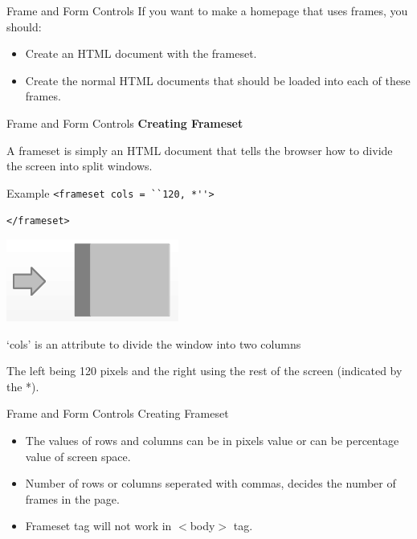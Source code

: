 \documentclass[14pt]{beamer}
\begin{document}
\begin{frame}{Frame and Form Controls}
If you want to make a homepage that uses frames, you should: 
\begin{itemize}
 \item Create an HTML document with the frameset.
 \item Create the normal HTML documents that should be loaded into each of these frames.
\end{itemize}
\end{frame}

\begin{frame}{Frame and Form Controls}
\textbf{Creating Frameset}

\vspace{1pc}
\small
A frameset is simply an HTML document that tells the browser how to divide the screen into split windows.

\begin{minipage}{5cm}
\begin{block}{Example}
\lstinline!<frameset cols = ``120, *''>!

\lstinline!</frameset>!
\end{block}
\end{minipage}
\quad
\begin{minipage}{4cm}
\includegraphics[scale=.4]{frameset-example.png}
\end{minipage}
`cols'  is an attribute to divide the window into two columns 

The left being 120 pixels and the right using the rest of the screen (indicated by the *).
\end{frame}

\begin{frame}{Frame and Form Controls}
Creating Frameset
\begin{itemize}
 \item The values of rows and columns can be in pixels value or can be percentage value of screen space.
 \item Number of rows or columns seperated with commas, decides the number of frames in the page.
 \item Frameset  tag will not work in $<$body$>$ tag.
\end{itemize}
\end{frame}
\end{document}
